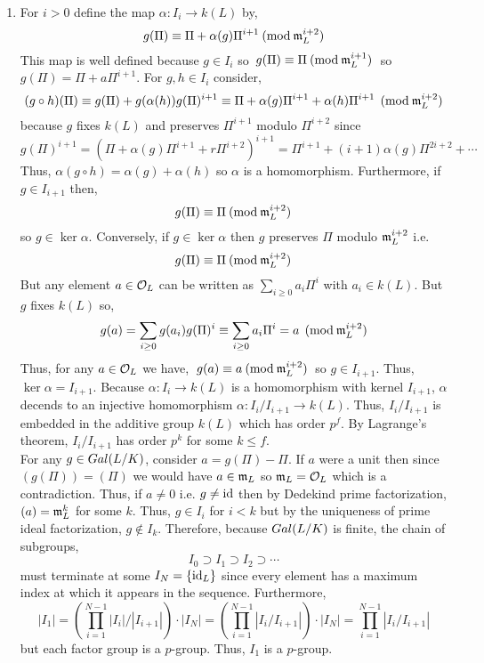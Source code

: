 \documentclass[12pt]{extarticle}
\begin{document}
\begin{enumerate}
\begin{enumerate}
\item For $ i > 0$ define the map $\alpha : I_i \to k(L)$ by,
\[ \: g(\Pi) \equiv \Pi + \alpha(g) \Pi^{i + 1} \: (\mathrm{mod} \: \mathfrak{m}_{L}^{i + 2}) \: \] 
This map is well defined because $g \in I_i$ so $\: g(\Pi) \equiv \Pi \: (\mathrm{mod} \: \mathfrak{m}_{L}^{i + 1}) \:$ so $g(\Pi) = \Pi + a \Pi^{i + 1}$. For $g, h \in I_i$ consider,
\[(g \circ h)(\Pi) \equiv g(\Pi) + g(\alpha(h)) g(\Pi)^{i + 1} \equiv \Pi + \alpha(g) \Pi^{i + 1} + \alpha(h) \Pi^{i + 1} \: \: (\mathrm{mod} \: \mathfrak{m}_{L}^{i + 2}) \]
because $g$ fixes $k(L)$ and preserves $\Pi^{i + 1}$ modulo $\Pi^{i + 2}$ since \[g(\Pi)^{i + 1} = (\Pi + \alpha(g) \Pi^{i + 1} + r \Pi^{i + 2})^{i + 1} = \Pi^{i + 1} + (i + 1)\alpha(g) \Pi^{2 i + 2} + \cdots \]
Thus, $\alpha(g \circ h) = \alpha(g) + \alpha(h)$ so $\alpha$ is a homomorphism. Furthermore, if $g \in I_{i + 1}$ then, 
\[ \: g(\Pi) \equiv \Pi \: (\mathrm{mod} \: \mathfrak{m}_{L}^{i+2}) \: \]
so $g \in \ker{\alpha}$. Conversely, if $g \in \ker{\alpha}$ then $g$ preserves $\Pi$ modulo $\mathfrak{m}_{L}^{i + 2}$ i.e.
\[ \: g(\Pi) \equiv \Pi \: (\mathrm{mod} \: \mathfrak{m}_{L}^{i + 2}) \: \]
But any element $a \in \mathcal{O}_{L}$ can be written as $\sum\limits_{i \ge 0} a_i \Pi^i$ with $a_i \in k(L)$. But $g$ fixes $k(L)$ so,
\begin{align*}
g(a) = \sum\limits_{i \ge 0} g(a_i) g(\Pi)^i \equiv \sum\limits_{i \ge 0} a_i \Pi^i = a \: \: (\mathrm{mod} \: \mathfrak{m}_{L}^{i + 2}) 
\end{align*}
Thus, for any $a \in \mathcal{O}_{L}$ we have, $\: g(a) \equiv a \: (\mathrm{mod} \: \mathfrak{m}_{L}^{i + 2}) \:$ so $g \in I_{i + 1}$. Thus, $\ker{\alpha} = I_{i + 1}$. Because $\alpha : I_i \to k(L)$ is a homomorphism with kernel $I_{i + 1}$, $\alpha$ decends to an injective homomorphism $\alpha : I_i/I_{i + 1} \to k(L)$. Thus, $I_i/I_{i + 1}$ is embedded in the additive group $k(L)$ which has order $p^f$. By Lagrange's theorem, $I_i/I_{i + 1}$ has order $p^k$ for some $k \le f$. \bigskip\\

For any $g \in Gal \small(L/K \small)$, consider $a = g(\Pi) - \Pi$. If $a$ were a unit then since $(g(\Pi)) = (\Pi)$ we would have $a \in \mathfrak{m}_{L}$ so $\mathfrak{m}_{L} = \mathcal{O}_{L}$ which is a contradiction. Thus, if $a \neq 0$ i.e. $g \neq \mathrm{id}$ then by Dedekind prime factorization, $(a) = \mathfrak{m}_{L}^k$ for some $k$. Thus, $g \in I_{i}$ for $i < k$ but by the uniqueness of prime ideal factorization, $g \notin I_k$. Therefore, because $Gal \small(L/K \small)$ is finite, the chain of subgroups,
\[ I_0 \supset I_1 \supset I_2 \supset \cdots \]
must terminate at some $I_N = \{ \mathrm{id}_L \}$ since every element has a maximum index at which it appears in the sequence. Furthermore,
\[ |I_1| = \left(\prod_{i = 1}^{N-1} |I_i|/|I_{i + 1}| \right) \cdot |I_N| = \left(\prod_{i = 1}^{N-1} |I_i/I_{i + 1}| \right) \cdot |I_N| = \prod_{i = 1}^{N-1} |I_i/I_{i + 1}|\]
but each factor group is a $p$-group. Thus, $I_1$ is a $p$-group. 


\end{enumerate}
\end{enumerate}
\end{document}
